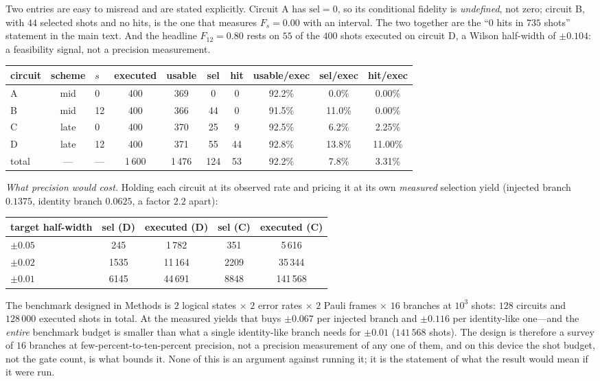 \documentclass[10pt,a4paper]{article}
\begin{document}
Two entries are easy to misread and are stated explicitly.  Circuit A has
$\mathrm{sel}=0$, so its conditional fidelity is \emph{undefined}, not zero; circuit
B, with $44$ selected shots and no hits, is the one that measures $F_s=0.00$ with an
interval.  The two together are the ``$0$ hits in $735$ shots'' statement in the main
text.  And the headline $F_{12}=0.80$ rests on $55$ of the $400$ shots executed on
circuit D, a Wilson half-width of $\pm0.104$: a feasibility signal, not a precision
measurement.
\begin{longtable}{lclccccccc}
\toprule circuit & scheme & $s$ & executed & usable & sel & hit & usable/exec & sel/exec & hit/exec \\ \midrule
A & mid & 0 & 400 & 369 & 0 & 0 & 92.2\% & 0.0\% & 0.00\% \\
B & mid & 12 & 400 & 366 & 44 & 0 & 91.5\% & 11.0\% & 0.00\% \\
C & late & 0 & 400 & 370 & 25 & 9 & 92.5\% & 6.2\% & 2.25\% \\
D & late & 12 & 400 & 371 & 55 & 44 & 92.8\% & 13.8\% & 11.00\% \\
total & --- & --- & 1\,600 & 1\,476 & 124 & 53 & 92.2\% & 7.8\% & 3.31\% \\
\bottomrule\end{longtable}

\vspace{4pt}\noindent\emph{What precision would cost.}  Holding each circuit at its
observed rate and pricing it at its own \emph{measured} selection yield (injected
branch $0.1375$, identity branch $0.0625$, a factor $2.2$ apart):

\noindent\begin{tabular}{lcccc}
\toprule target half-width & sel (D) & executed (D) & sel (C) & executed (C) \\
\midrule
$\pm0.05$ & 245 & 1\,782 & 351 & 5\,616 \\
$\pm0.02$ & 1535 & 11\,164 & 2209 & 35\,344 \\
$\pm0.01$ & 6145 & 44\,691 & 8848 & 141\,568 \\
\bottomrule\end{tabular}

\vspace{4pt}\noindent The benchmark designed in Methods is $2$ logical states
$\times$ $2$ error rates $\times$ $2$ Pauli frames $\times$ $16$ branches at $10^3$
shots: $128$ circuits and $128\,000$ executed shots in total.  At the measured yields that
buys $\pm0.067$ per injected branch and $\pm0.116$ per identity-like one---and the
\emph{entire} benchmark budget is smaller than what a single identity-like branch
needs for $\pm0.01$ ($141\,568$ shots).  The design is therefore a survey of $16$ branches
at few-percent-to-ten-percent precision, not a precision measurement of any one of
them, and on this device the shot budget, not the gate count, is what bounds it.
None of this is an argument against running it; it is the statement of what the
result would mean if it were run.
\end{document}
